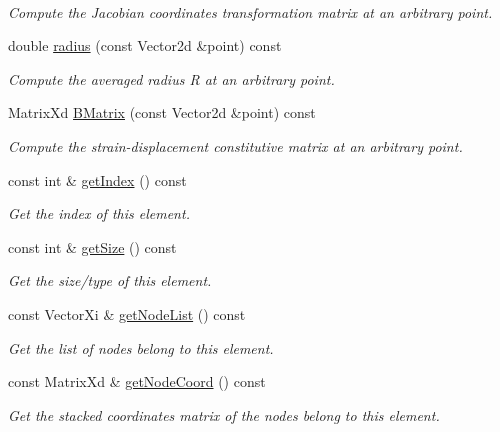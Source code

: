 \begin{DoxyCompactItemize}
$$\begin{DoxyCompactList}\small\item\em Compute the Jacobian coordinates transformation matrix at an arbitrary point. \end{DoxyCompactList}\item 
double \mbox{\hyperlink{class_element_abab2c4f446d46785abcdfd17777e80d4}{radius}} (const Vector2d \&point) const
\begin{DoxyCompactList}\small\item\em Compute the averaged radius R at an arbitrary point. \end{DoxyCompactList}\item 
Matrix\+Xd \mbox{\hyperlink{class_element_a19f8ba5c4c7569c3bcccf1b422a7dd89}{B\+Matrix}} (const Vector2d \&point) const
\begin{DoxyCompactList}\small\item\em Compute the strain-\/displacement constitutive matrix at an arbitrary point. \end{DoxyCompactList}\item 
const int \& \mbox{\hyperlink{class_element_a85dc312253f1d39c29659393fbb1d485}{get\+Index}} () const
\begin{DoxyCompactList}\small\item\em Get the index of this element. \end{DoxyCompactList}\item 
const int \& \mbox{\hyperlink{class_element_a0221b246d9ca632136cc39790c46ee8f}{get\+Size}} () const
\begin{DoxyCompactList}\small\item\em Get the size/type of this element. \end{DoxyCompactList}\item 
const Vector\+Xi \& \mbox{\hyperlink{class_element_a763e0e4a46e68823903557a605dc5474}{get\+Node\+List}} () const
\begin{DoxyCompactList}\small\item\em Get the list of nodes belong to this element. \end{DoxyCompactList}\item 
const Matrix\+Xd \& \mbox{\hyperlink{class_element_a4d12b24e62592a1456e04d15872d5240}{get\+Node\+Coord}} () const
\begin{DoxyCompactList}\small\item\em Get the stacked coordinates matrix of the nodes belong to this element. \end{DoxyCompactList}\end{DoxyCompactItemize}
